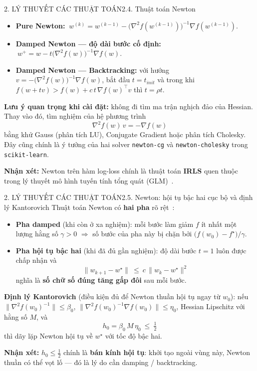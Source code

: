 \documentclass[aspectratio=169,11pt]{beamer}
\newcommand{\nx}{\textbf{Nhận xét:}}
\newcommand{\wstar}{w^{\star}}
\newcommand{\norm}[1]{\lVert #1 \rVert}
\begin{document}
\begin{frame}{2. LÝ THUYẾT CÁC THUẬT TOÁN}{2.4. Thuật toán Newton}
  \small
  \begin{itemize}
    \item \textbf{Pure Newton:} $\ w^{(k)}=w^{(k-1)}-\big(\nabla^2f(w^{(k-1)})\big)^{-1}\nabla f(w^{(k-1)})$.
    \item \textbf{Damped Newton — độ dài bước cố định:} $\ w^{+}=w-t\big(\nabla^2f(w)\big)^{-1}\nabla f(w)$.
    \item \textbf{Damped Newton — Backtracking:} với hướng $v=-\big(\nabla^2f(w)\big)^{-1}\nabla f(w)$,
          bắt đầu $t=t_{init}$ và trong khi $f(w+tv)>f(w)+c\,t\,\nabla f(w)^\top v$ thì $t=\rho t$.
  \end{itemize}
  \vspace{6pt}
  \textbf{Lưu ý quan trọng khi cài đặt:} không đi tìm ma trận nghịch đảo của Hessian.
  Thay vào đó, tìm nghiệm của hệ phương trình
  \[
    \nabla^2 f(w)\, v=-\nabla f(w)
  \]
  bằng khử Gauss (phân tích LU), Conjugate Gradient hoặc phân tích Cholesky. Đây cũng chính là
  ý tưởng của hai solver \texttt{newton-cg} và \texttt{newton-cholesky} trong \texttt{scikit-learn}.
  \vspace{4pt}

  \nx{} Newton trên hàm log-loss chính là thuật toán \textbf{IRLS} quen thuộc trong lý thuyết
  mô hình tuyến tính tổng quát (GLM)~\cite{nocedal2006numerical}.
\end{frame}

\begin{frame}{2. LÝ THUYẾT CÁC THUẬT TOÁN}{2.5. Newton: hội tụ bậc hai cục bộ và định lý Kantorovich}
  \small
  Thuật toán Newton có \textbf{hai pha} rõ rệt~\cite{boyd2004convex}:
  \begin{itemize}
    \item \textbf{Pha damped} (khi còn ở xa nghiệm): mỗi bước làm giảm $f$ ít nhất một lượng
          hằng số $\gamma>0$ $\Rightarrow$ số bước của pha này bị chặn bởi $\big(f(w_0)-f^\star\big)/\gamma$.
    \item \textbf{Pha hội tụ bậc hai} (khi đã đủ gần nghiệm): độ dài bước $t=1$ luôn được chấp nhận và
          \[
            \norm{w_{k+1}-\wstar}\ \le\ c\,\norm{w_k-\wstar}^2
          \]
          nghĩa là \textbf{số chữ số đúng tăng gấp đôi} sau mỗi bước.
  \end{itemize}
  \vspace{4pt}
  \textbf{Định lý Kantorovich} (điều kiện đủ để Newton thuần hội tụ ngay từ $w_0$): nếu
  $\norm{\nabla^2f(w_0)^{-1}}\le\beta_0$, $\norm{\nabla^2f(w_0)^{-1}\nabla f(w_0)}\le\eta_0$,
  Hessian Lipschitz với hằng số $M$, và
  \[
    h_0=\beta_0\,M\,\eta_0\ \le\ \tfrac12
  \]
  thì dãy lặp Newton hội tụ về $\wstar$ với tốc độ bậc hai.
  \vspace{2pt}

  \nx{} $h_0\le\frac12$ chính là \textbf{bán kính hội tụ}: khởi tạo ngoài vùng này, Newton thuần
  có thể vọt lố — đó là lý do cần damping / backtracking.
\end{frame}
\end{document}
